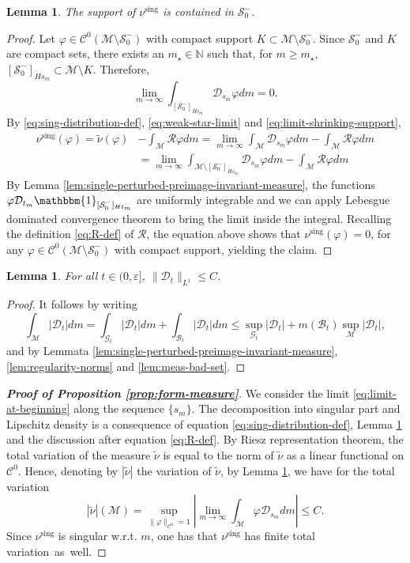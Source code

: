 \documentclass{amsart}
\numberwithin{equation}{section}
\newtheorem{lemma}[theorem]{Lemma}
\newcommand\ve{\varepsilon}
\newcommand\vf{\varphi}
\renewcommand{\ge}{\geqslant}
\renewcommand{\le}{\leqslant}
\newcommand\cB{{\mathcal B}}
\newcommand\cC{{\mathcal C}}
\newcommand\cG{{\mathcal G}}
\newcommand\cM{{\mathcal M}}
\newcommand\cR{{\mathcal R}}
\newcommand\cS{{\mathcal S}}
\newcommand\bN{{\mathbb N}}
\newcommand{\Deriv}{\mathcal D}
\newcommand{\sing}{\nu^{\text{sing}}}
\begin{document}
\begin{lemma}\label{lem:sing}
The support of \(\sing\) is contained in \(\cS_0^{-}\).
\end{lemma}
\begin{proof}
Let \(\vf \in \cC^0(\cM \setminus \cS_0^-)\) with compact support \(K \subset \cM \setminus \cS_0^-\). Since \(\cS_0^{-}\) and \(K\) are compact sets, there exists an \(m_{\star} \in \bN\) such that, for \(m \ge m_{\star}\), \([\cS_0^-]_{Hs_m} \subset \cM \setminus K\). Therefore,
\begin{equation}\label{eq:limit-shrinking-support}
     \lim_{m \to \infty} \int_{[\cS_0^-]_{Hs_m}} \Deriv_{s_m} \vf dm = 0.  
\end{equation}
By \eqref{eq:sing-distribution-def}, \eqref{eq:weak-star-limit} and \eqref{eq:limit-shrinking-support},
\[
\begin{split}
    \sing(\vf) = \widetilde \nu(\vf) &- \int_{\cM}\mathcal R \vf dm = \lim_{m \to \infty} \int_{\cM} \Deriv_{s_m} \vf dm - \int_{\cM} \mathcal R \vf dm \\
&= \lim_{m \to \infty} \int_{\cM  \setminus [\cS_{0}^{-}]_{Hs_m}} \Deriv_{s_m} \vf dm - \int_{\cM}\mathcal R \vf dm
\end{split}
\]
By Lemma \ref{lem:single-perturbed-preimage-invariant-measure}, the functions \(\vf \Deriv_{t_m}\mathbbm{1}_{[\cS_0^-]_{Ht_{m}}}\) are uniformly integrable and we can apply Lebesgue dominated convergence theorem to bring the limit inside the integral. Recalling the definition \eqref{eq:R-def} of \(\cR\), the equation above shows that \(\sing(\vf) = 0\), for any \(\vf \in \cC^{0}(\cM \setminus \cS_{0}^-)\) with compact support, yielding the claim.
\end{proof}
\begin{lemma}\label{lem:total-variation}
For all \(t \in (0,\ve]\), \(\|\Deriv_t\|_{L^1} \le C\).
\end{lemma}
\begin{proof}
It follows by writing 
\[
\int_{\cM}|\Deriv_t|dm = \int_{\cG_t}|\Deriv_t| dm + \int_{\cB_t}|\Deriv_t|dm \le \sup_{\cG_t}|\Deriv_t| + m(\cB_t) \sup_{\cM}|\Deriv_t|,
\]
and by Lemmata \ref{lem:single-perturbed-preimage-invariant-measure}, \ref{lem:regularity-norms} and \ref{lem:meas-bad-set}.
\end{proof}
\begin{proof}[\textbf{Proof of Proposition \ref{prop:form-measure}}] We consider the limit \eqref{eq:limit-at-beginning} along the sequence \(\{s_m\}\). The decomposition into singular part and Lipschitz density is a consequence of equation \eqref{eq:sing-distribution-def}, Lemma \ref{lem:sing} and the discussion after equation \eqref{eq:R-def}. By Riesz representation theorem, the total variation of the measure \(\widetilde \nu\) is equal to the norm of \(\widetilde \nu\) as a linear functional on \(\cC^0\). Hence, denoting by \(|\widetilde \nu|\) the variation of \(\widetilde \nu\), by Lemma \ref{lem:total-variation}, we have for the total variation
\[
   |\widetilde \nu|(\cM) = \sup_{\|\vf\|_{\cC^0} =1} \left|\lim_{m \to \infty}\int_{\cM} \vf \Deriv_{s_m}dm \right| \le C.
\]
 Since \(\sing\) is singular w.r.t. \(m\), one has that \(\sing\) has finite total \mbox{variation as well}.
\end{proof}
\end{document}
